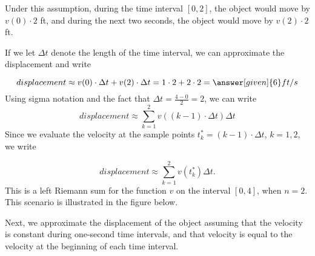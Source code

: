 \documentclass{ximera}
\begin{document}
\begin{example}
\begin{explanation}
 Under this assumption,  during the time interval $[0,2]$, the object would move by $v(0)\cdot2$ ft, and during the next two seconds, the object would move by $v(2)\cdot2$ ft.
 
  
If we let $\Delta t$ denote the length of the time interval, we can approximate the displacement  and write

  \[
   displacement\approx v(0)\cdot\Delta t+v(2)\cdot\Delta t=1\cdot2+2\cdot2=\answer[given]{6} ft/s
  \]
Using sigma notation and the fact that $\Delta t=\frac{4-0}{2}=2$, we can write
\[
   displacement\approx \sum_{k=1}^2v((k-1)\cdot\Delta t)\Delta t
  \]
Since we evaluate the velocity at the sample points $t_{k}^*=(k-1)\cdot\Delta t$, $k=1,2$, we  write

\[
   displacement\approx \sum_{k=1}^2v(t_{k}^*)\Delta t.
  \]
  This is a left Riemann sum for the function $v$ on the interval $[0,4]$, when $n=2$.
This scenario is illustrated in the figure below.
\begin{image}
\end{image}
Next, we approximate the displacement of the object assuming that the velocity is constant during one-second time intervals, and that velocity is equal to the velocity at the beginning of each time interval.



\end{explanation}
\end{example}
\end{document}
